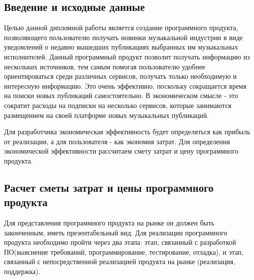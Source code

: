 
\subsection{Введение и исходные данные}

Целью данной дипломной работы является создание программного продукта, позволяющего пользователю получать новинки музыкальной индустрии в виде уведомлений о недавно вышедших публикациях выбранных им музыкальных исполнителей. Данный программный продукт позволит получать информацию из нескольких источников, тем самым помогая пользователю удобнее ориентироваться среди различных сервисов, получать только необходимую и интересную информацию. Это очень эффективно, поскольку сокращается время на поиски новых публикаций самостоятельно. В экономическом смысле - это сократит расходы на подписки на несколько сервисов, которые занимаются размещением на своей платформе новых музыкальных публикаций.

Для разработчика экономическая эффективность будет определяться как прибыль от реализации, а для пользователя - как экономия затрат. Для определения экономической эффективности рассчитаем смету затрат и цену программного продукта.

\subsection{Расчет сметы затрат и цены программного продукта}

Для представления программного продукта на рынке он должен быть законченным, иметь презентабельный вид. Для реализации программного продукта необходимо пройти через два этапа: этап, связанный с разработкой ПО(выяснение требований, программирование, тестирование, отладка), и этап, связанный с непосредственной реализацией продукта на рынке (реализация, поддержка).

